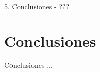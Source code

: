 \label{chap:conclusiones}

\minitoc\mtcskip
\vfill


5. Conclusiones
 - ???


\section{Conclusiones} 

\lettrine{C}onclusiones ...
